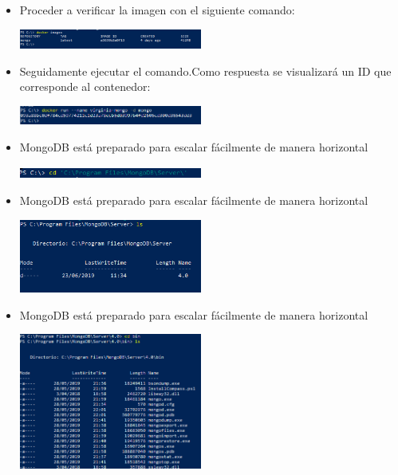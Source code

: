 \documentclass[%
 reprint,
 amsmath,amssymb,
 aps,
]{revtex4-1}
\begin{document}
\begin{itemize}
\begin{center}
		\end{center}	
                     \item Proceder a verificar la imagen con el siguiente comando:
                     \begin{center}
		\includegraphics[width=6cm]{./Imagenes/15}
		\end{center}	
                     \item Seguidamente ejecutar el comando.Como respuesta se visualizará un ID que corresponde al contenedor:
                     \begin{center}
		\includegraphics[width=6cm]{./Imagenes/16}
		\end{center}	
                     \item MongoDB está preparado para escalar fácilmente de manera horizontal
                     \begin{center}
		\includegraphics[width=6cm]{./Imagenes/17}
		\end{center}	
                     \item MongoDB está preparado para escalar fácilmente de manera horizontal
                     \begin{center}
		\includegraphics[width=6cm]{./Imagenes/18}
		\end{center}	
                     \item MongoDB está preparado para escalar fácilmente de manera horizontal
                     \begin{center}
		\includegraphics[width=6cm]{./Imagenes/20}

\end{center}
\end{itemize}
\end{document}
